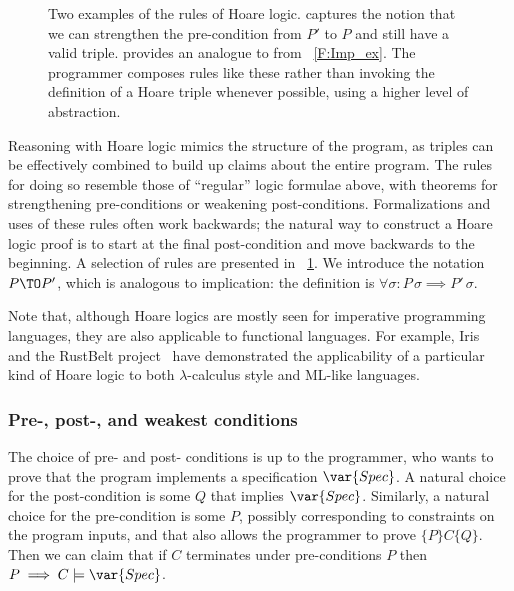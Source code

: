 \begin{figure}[ht]
    \centering
    \caption{Two examples of the rules of Hoare logic.
     captures the notion that we can strengthen the
    pre-condition from \(P'\) to \(P\) and still have a valid triple.
     provides an analogue to  from
    \figurename~\ref{F:Imp_ex}. The programmer composes rules like these rather
    than invoking the definition of a Hoare triple whenever possible, using a
    higher level of abstraction.}\label{F:Hoare_ex}
\end{figure}

Reasoning with Hoare logic mimics the structure of the program, as triples can
be effectively combined to build up claims about the entire program. The rules
for doing so resemble those of ``regular'' logic formulae above, with theorems
for strengthening pre-conditions or weakening post-conditions. Formalizations
and uses of these rules often work backwards; the natural way to construct a
Hoare logic proof is to start at the final post-condition and move backwards to
the beginning. A selection of rules are presented in
\figurename~\ref{F:Hoare_ex}. We introduce the notation \(P \TO P'\), which is
analogous to implication: the definition is \(\forall \sigma: P\, \sigma
\implies P'\, \sigma\).

Note that, although Hoare logics are mostly seen for imperative programming
languages, they are also applicable to functional languages. For example,
Iris~\cite[\S 5.1]{Krebbers_2017b} and the RustBelt project~\cite[\S
3.2, esp. \figurename~3]{Jung_2018a} have demonstrated the applicability of a
particular kind of Hoare logic to both \(\lambda\)-calculus style and ML-like
languages.

\subsubsection{Pre-, post-, and weakest conditions}

The choice of pre- and post- conditions is up to the programmer, who wants to
prove that the program implements a specification \(\var{Spec}\). A natural
choice for the post-condition is some \(Q\) that implies \(\var{Spec}\).
Similarly, a natural choice for the pre-condition is some \(P\), possibly
corresponding to constraints on the program inputs, and that also allows the
programmer to prove \(\{P\} C \{Q\}\). Then we can claim that if \(C\)
terminates under pre-conditions \(P\) then \(P \implies C \models \var{Spec}\).

